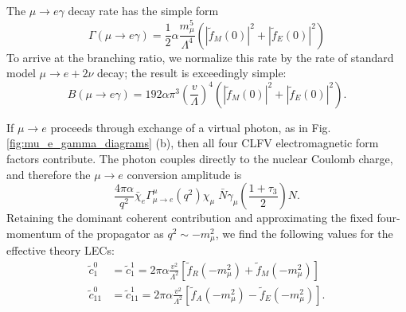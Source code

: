 \documentclass{book}[12pt]
\begin{document}
The $\mu\rightarrow e\gamma$ decay rate has the simple form
\begin{equation}
\Gamma\left(\mu\rightarrow e\gamma\right)=\frac{1}{2}\alpha\frac{m_{\mu}^5}{\Lambda^4}\left(|\tilde{f}_M(0)|^2+|\tilde{f}_E(0)|^2\right)
\end{equation}
To arrive at the branching ratio, we normalize this rate by the rate of standard model $\mu\rightarrow e+2\nu$ decay; the result is exceedingly simple:
\begin{equation}
B(\mu\rightarrow e\gamma)=192\alpha\pi^3\left(\frac{v}{\Lambda}\right)^4\left(|\tilde{f}_{M}(0)|^2+|\tilde{f}_E(0)|^2\right).
\end{equation}

If $\mu\rightarrow e$ proceeds through exchange of a virtual photon, as in Fig. \ref{fig:mu_e_gamma_diagrams} (b), then all four CLFV electromagnetic form factors contribute. The photon couples directly to the nuclear Coulomb charge, and therefore the $\mu\rightarrow e$ conversion amplitude is
\begin{equation}
\frac{4\pi\alpha}{q^2}\bar{\chi}_e\Gamma^{\mu}_{\mu\rightarrow e}(q^2)\chi_{\mu}\;\bar{N}\gamma_{\mu}\left(\frac{1+\tau_3}{2}\right)N.
\end{equation}
Retaining the dominant coherent contribution and approximating the fixed four-momentum of the propagator as $q^2\sim -m_{\mu}^2$, we find the following values for the effective theory LECs:
\begin{equation}
\begin{split}
\tilde{c}_1^0&=\tilde{c}_1^1=2\pi\alpha\frac{v^2}{\Lambda^2}\left[\tilde{f}_R(-m_{\mu}^2)+\tilde{f}_M(-m_{\mu}^2)\right]\\
\tilde{c}_{11}^0&=\tilde{c}_{11}^1=2\pi\alpha\frac{v^2}{\Lambda^2}\left[\tilde{f}_A(-m_{\mu}^2)-\tilde{f}_E(-m_{\mu}^2)\right].
\end{split}
\end{equation}
\end{document}
